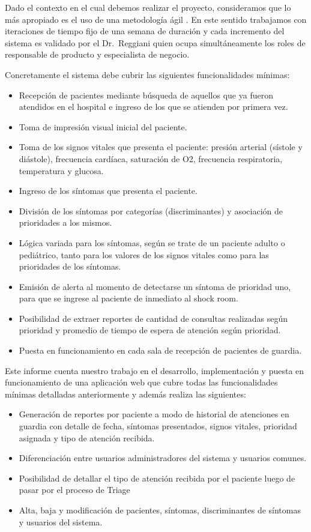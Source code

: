 Dado el contexto en el cual debemos realizar el proyecto, consideramos que lo más apropiado es el uso de una metodología ágil \cite{Shore}. En este sentido trabajamos con iteraciones de tiempo fijo de una semana de duración y cada incremento del sistema es validado por el Dr.\ Reggiani quien ocupa simultáneamente los roles de responsable de producto y especialista de negocio.

Concretamente el sistema debe cubrir las siguientes funcionalidades mínimas:
\begin{itemize}
\item Recepción de pacientes mediante búsqueda de aquellos que ya fueron atendidos en el hospital e ingreso de los que se atienden por primera vez.
\item Toma de impresión visual inicial del paciente.
\item Toma de los signos vitales que presenta el paciente: presión arterial (sístole y diástole), frecuencia cardíaca, saturación de O2, frecuencia respiratoria, temperatura y glucosa.
\item Ingreso de los síntomas que presenta el paciente.
\item División de los síntomas por categorías (discriminantes) y asociación de prioridades a los mismos.
\item Lógica variada para los síntomas, según se trate de un paciente adulto o pediátrico, tanto para los valores de los signos vitales como para las prioridades de los síntomas.
\item Emisión de alerta al momento de detectarse un síntoma de prioridad uno, para que se ingrese al paciente de inmediato al shock room.
\item Posibilidad de extraer reportes de cantidad de consultas realizadas según prioridad y promedio de tiempo de espera de atención según prioridad.
\item Puesta en funcionamiento en cada sala de recepción de pacientes de guardia.
\end{itemize}

Este informe cuenta nuestro trabajo en el desarrollo, implementación y puesta en funcionamiento de una aplicación web que cubre todas las funcionalidades mínimas detalladas anteriormente y además realiza las siguientes:
\begin{itemize}
\item Generación de reportes por paciente a modo de historial de atenciones en guardia con detalle de fecha, síntomas presentados, signos vitales, prioridad asignada y tipo de atención recibida.
\item Diferenciación entre usuarios administradores del sistema y usuarios comunes.
\item Posibilidad de detallar el tipo de atención recibida por el paciente luego de pasar por el proceso de Triage
\item Alta, baja y modificación de pacientes, síntomas, discriminantes de síntomas y usuarios del sistema.
\end{itemize}


